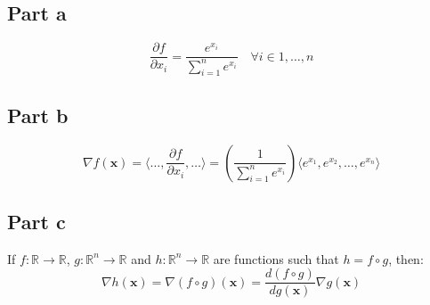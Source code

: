 \documentclass{article}
\begin{document}
\subsection*{Part a}
\begin{flushleft}
\begin{equation}
\frac{\partial f}{\partial x_{i}} = \frac{e^{x_i}}{\displaystyle \sum_{i=1}^{n} e^{x_i}} \quad \forall i \in 1, \ldots, n
\end{equation}
\end{flushleft}

\subsection*{Part b}
\begin{flushleft}
\begin{equation}
\nabla f(\mathbf{x}) = \langle \ldots, \frac{\partial f}{\partial x_{i}}, \ldots\rangle = \left(\frac{1}{\displaystyle \sum_{i=1}^{n} e^{x_i}}\right) \langle e^{x_1}, e^{x_2}, \ldots, e^{x_n}\rangle
\end{equation}
\end{flushleft}

\subsection*{Part c}
\begin{flushleft}
If \(f : \mathbb{R} \to \mathbb{R}\), \(g : \mathbb{R}^{n} \to \mathbb{R}\) and \(h : \mathbb{R}^{n} \to \mathbb{R}\) are functions such that \(h = f \circ g\), then:
\begin{equation}
\nabla h(\mathbf{x}) = \nabla (f \circ g)(\mathbf{x}) = \frac{d(f \circ g)}{dg(\mathbf{x})} \nabla g(\mathbf{x})
\end{equation}
\end{flushleft}
\end{document}

